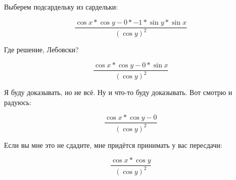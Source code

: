 \documentclass[12pt]{article}
\begin{document}
Выберем подсардельку из сардельки:

$$ \frac{\cos{x  }  * \cos{y  }   - 0  * -1  * \sin{y  }    * \sin{x  }    }{{( \cos{y  } ) }^{2  }  }  $$

Где решение, Лебовски?

$$ \frac{\cos{x  }  * \cos{y  }   - 0  * \sin{x  }    }{{( \cos{y  } ) }^{2  }  }  $$

Я буду доказывать, но не всё. Ну и что-то буду доказывать. Вот смотрю и радуюсь:

$$ \frac{\cos{x  }  * \cos{y  }   - 0   }{{( \cos{y  } ) }^{2  }  }  $$

Если вы мне это не сдадите, мне придётся принимать у вас пересдачи:

$$ \frac{\cos{x  }  * \cos{y  }   }{{( \cos{y  } ) }^{2  }  }  $$
\end{document}
